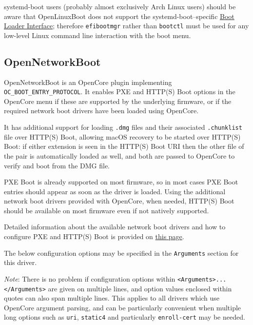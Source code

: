 \documentclass[]{article}
\begin{document}
systemd-boot users (probably almost exclusively Arch Linux users) should be aware that OpenLinuxBoot
does not support the systemd-boot--specific \href{https://systemd.io/BOOT\_LOADER\_INTERFACE/}{Boot Loader Interface};
therefore \texttt{efibootmgr} rather than \texttt{bootctl} must be used for any low-level Linux command line interaction
with the boot menu.

\subsection{OpenNetworkBoot}\label{uefinetboot}

OpenNetworkBoot is an OpenCore plugin implementing \texttt{OC\_BOOT\_ENTRY\_PROTOCOL}.
It enables PXE and HTTP(S) Boot options in the OpenCore menu if these
are supported by the underlying firmware, or if the required network boot drivers
have been loaded using OpenCore.

It has additional support for loading \texttt{.dmg} files and their associated
\texttt{.chunklist} file over HTTP(S) Boot, allowing macOS recovery to be
started over HTTP(S) Boot: if either extension is seen in the HTTP(S) Boot URI
then the other file of the pair is automatically loaded as well, and both are
passed to OpenCore to verify and boot from the DMG file.

PXE Boot is already supported on most firmware, so in most cases PXE Boot entries
should appear as soon as the driver is loaded. Using the additional network boot
drivers provided with OpenCore, when needed, HTTP(S) Boot should be available on
most firmware even if not natively supported.

Detailed information about the available network boot drivers and how to configure
PXE and HTTP(S) Boot is provided on
\href{https://github.com/acidanthera/OpenCorePkg/blob/master/Platform/OpenNetworkBoot/README.md}{this page}.

The below configuration options may be specified in the \texttt{Arguments} section for this driver.

\emph{Note}: There is no problem if configuration options within \texttt{<Arguments>...</Arguments>} are given on
multiple lines, and option values enclosed within quotes can also span multiple lines. This applies to all drivers
which use OpenCore argument parsing, and can be particularly convenient when multiple long options such as \texttt{uri},
\texttt{static4} and particularly \texttt{enroll-cert} may be needed.  
\end{document}
